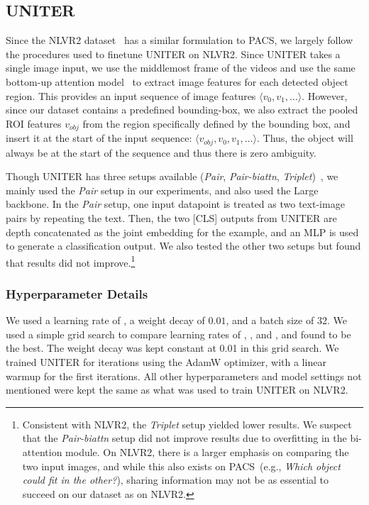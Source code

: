 \documentclass[runningheads]{llncs}
\newcommand{\names}{\textsc{PACS}}
\begin{document}
\subsection{UNITER~\cite{chen2020uniter}}

Since the NLVR2 dataset~\cite{suhr2019nlvr2} has a similar formulation to \names, we largely follow the procedures used to finetune UNITER on NLVR2. Since UNITER takes a single image input, we use the middlemost frame of the videos and use the same bottom-up attention model~\cite{anderson2017bottomup} to extract image features for each detected object region. This provides an input sequence of image features $\langle v_0, v_1, \dots \rangle$. However, since our dataset contains a predefined bounding-box, we also extract the pooled ROI features $v_{obj}$ from the region specifically defined by the bounding box, and insert it at the start of the input sequence: $\langle v_{obj}, v_0, v_1, \dots \rangle$. Thus, the object will always be at the start of the sequence and thus there is  zero ambiguity. 

Though UNITER has three setups available (\textit{Pair}, \textit{Pair-biattn}, \textit{Triplet})~\cite{chen2020uniter}, we mainly used the \textit{Pair} setup in our experiments, and also used the Large backbone. In the \textit{Pair} setup,  one input datapoint is treated as two
text-image pairs by repeating the text. Then, the two [CLS] outputs from UNITER are depth concatenated as the joint embedding for the example, and an MLP is used to generate a classification output. We also tested the other two setups but found that results did not improve.\footnote{Consistent with NLVR2, the \textit{Triplet} setup yielded lower results. We suspect that the \textit{Pair-biattn} setup did not improve results due to  overfitting in the bi-attention module. On NLVR2, there is a larger emphasis on comparing the two input images, and while this also exists on \names\ (e.g., \textit{Which object could fit in the other?}), sharing information may not be as essential to succeed on our dataset as on NLVR2.}

\subsubsection{Hyperparameter Details} We used a learning rate of , a weight decay of $0.01$, and a batch size of 32. We used a simple grid search to compare learning rates of , , and , and found  to be the best. The weight decay was kept constant at 0.01 in this grid search. We trained UNITER for  iterations using the AdamW optimizer, with a linear warmup for the first  iterations. All other hyperparameters and model settings not mentioned were kept the same as what was used to train UNITER on NLVR2. 
\end{document}
